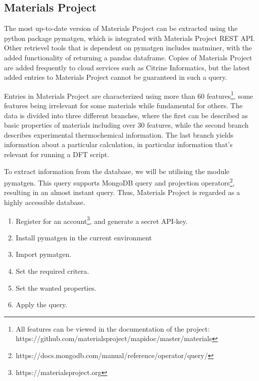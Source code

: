 
\subsection{Materials Project}
\label{ssec:materialsproject}

The most up-to-date version of Materials Project can be extracted using the python package pymatgen, which is integrated with Materials Project REST API. Other retrievel tools that is dependent on pymatgen includes matminer, with the added functionality of returning a pandas dataframe. Copies of Materials Project are added frequently to cloud services such as Citrine Informatics, but the latest added entries to Materials Project cannot be guaranteed in such a query.

Entries in Materials Project are characterized using more than 60 features\footnote{All features can be viewed in the documentation of the project: https://github.com/materialsproject/mapidoc/master/materials}, some features being irrelevant for some materials while fundamental for others. The data is divided into three different branches, where the first can be described as basic properties of materials including over $30$ features, while the second branch describes experimental thermochemical information. The last branch yields information about a particular calculation, in particular information that's relevant for running a DFT script.

To extract information from the database, we will be utilising the module pymatgen. This query supports MongoDB query and projection operators\footnote{https://docs.mongodb.com/manual/reference/operator/query/}, resulting in an almost instant query. Thus, Materials Project is regarded as a highly accessible database.

\begin{enumerate}
  \item Register for an account\footnote{https://materialsproject.org}, and generate a secret API-key.
  \item Install pymatgen in the current environment
  \item Import pymatgen.
  \item Set the required critera.
  \item Set the wanted properties.
  \item Apply the query.
\end{enumerate}

